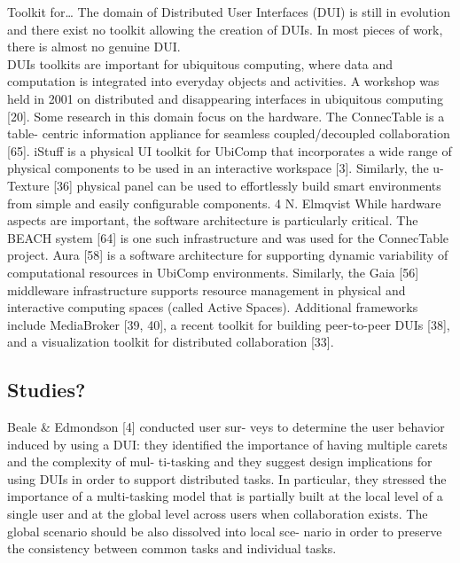 \cite{melchior69toolkit} Toolkit for\ldots
\cite{melchior2011distribution}The domain of Distributed User Interfaces (DUI) is still in evolution and there exist no toolkit allowing the creation of DUIs.
In most pieces of work, there is almost no genuine DUI. \\
\cite{elmqvist2011distributed}
DUIs toolkits are important for ubiquitous computing, where data and computation is integrated into everyday objects and activities. A workshop was held in 2001 on distributed and disappearing interfaces in ubiquitous computing [20].
Some research in this domain focus on the hardware. The ConnecTable is a table- centric information appliance for seamless coupled/decoupled collaboration [65]. iStuff is a physical UI toolkit for UbiComp that incorporates a wide range of physical components to be used in an interactive workspace [3]. Similarly, the u-Texture [36] physical panel can be used to effortlessly build smart environments from simple and easily configurable components.
4 N. Elmqvist
While hardware aspects are important, the software architecture is particularly critical. The BEACH system [64] is one such infrastructure and was used for the ConnecTable project. Aura [58] is a software architecture for supporting dynamic variability of computational resources in UbiComp environments. Similarly, the Gaia [56] middleware infrastructure supports resource management in physical and interactive computing spaces (called Active Spaces). Additional frameworks include MediaBroker [39, 40], a recent toolkit for building peer-to-peer DUIs [38], and a visualization toolkit for distributed collaboration [33].


\subsection{Studies?}
\cite{vanderdonckt2010distributed} Beale & Edmondson [4] conducted user sur-
veys to determine the user behavior induced by using a DUI: they identified the
importance of having multiple carets and the complexity of mul- ti-tasking and
they suggest design implications for using DUIs in order to support distributed
tasks. In particular, they stressed the importance of a multi-tasking model that is partially built at the local level of a single user and at the global level across users when collaboration exists. The global scenario should be also dissolved into local sce- nario in order to preserve the consistency between common tasks and individual tasks.\\\
 
